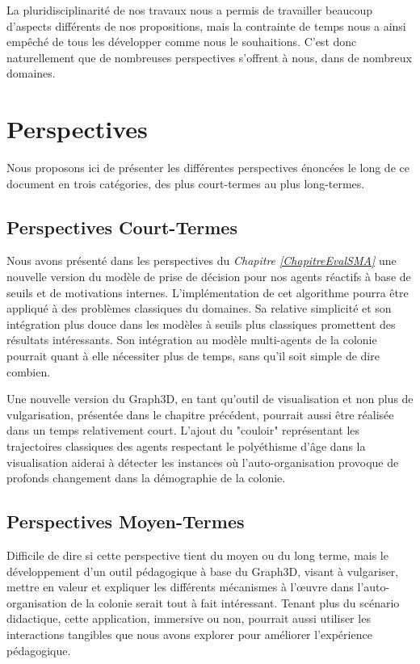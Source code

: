 	 La pluridisciplinarité de nos travaux nous a permis de travailler beaucoup d'aspects différents de nos propositions, mais la contrainte de temps nous a ainsi empêché de tous les développer comme nous le souhaitions. C'est donc naturellement que de nombreuses perspectives s'offrent à nous, dans de nombreux domaines.
	
\section*{Perspectives}
	Nous proposons ici de présenter les différentes perspectives énoncées le long de ce document en trois catégories, des plus court-termes au plus long-termes.
	
	\subsection{Perspectives Court-Termes}	
	Nous avons présenté dans les perspectives du \textit{Chapitre \ref{ChapitreEvalSMA}} une nouvelle version du modèle de prise de décision pour nos agents réactifs à base de seuils et de motivations internes. L'implémentation de cet algorithme pourra être appliqué à des problèmes classiques du domaines. Sa relative simplicité et son intégration plus douce dans les modèles à seuils plus classiques promettent des résultats intéressants. Son intégration au modèle multi-agents de la colonie pourrait quant à elle nécessiter plus de temps, sans qu'il soit simple de dire combien.
	
	Une nouvelle version du Graph3D, en tant qu'outil de visualisation et non plus de vulgarisation, présentée dans le chapitre précédent, pourrait aussi être réalisée dans un temps relativement court. L'ajout du "couloir" représentant les trajectoires classiques des agents respectant le polyéthisme d'âge dans la visualisation aiderai à détecter les instances où l'auto-organisation provoque de profonds changement dans la démographie de la colonie.
	\subsection{Perspectives Moyen-Termes}	
	Difficile de dire si cette perspective tient du moyen ou du long terme, mais le développement d'un outil pédagogique à base du Graph3D, visant à vulgariser, mettre en valeur et expliquer les différents mécanismes à l'œuvre dans l'auto-organisation de la colonie serait tout à fait intéressant. Tenant plus du scénario didactique, cette application, immersive ou non, pourrait aussi utiliser les interactions tangibles que nous avons explorer pour améliorer l'expérience pédagogique.
